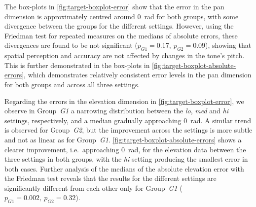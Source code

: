 \documentclass[acmsmall]{acmart}
\begin{document}
The box-plots in \cref{fig:target-boxplot-error} show that the error in the pan dimension is approximately centred around \SI{0}{\radian} for both groups, with some divergence between the groups for the different settings.
However, using the Friedman test for repeated measures on the medians of absolute errors, these divergences are found to be not significant ($p_{G1} = 0.17,~p_{G2} = 0.09$), showing that spatial perception and accuracy are not affected by changes in the tone's pitch.
This is further demonstrated in the box-plots in \cref{fig:target-boxplot-absolute-errors}, which demonstrates relatively consistent error levels in the pan dimension for both groups and across all three settings. 

Regarding the errors in the elevation dimension in \cref{fig:target-boxplot-error}, we observe in Group~\textit{G1} a narrowing distribution between the \textit{lo}, \textit{med} and \textit{hi} settings, respectively, and a median gradually approaching \SI{0}{\radian}.
A similar trend is observed for Group~\textit{G2}, but the improvement across the settings is more subtle and not as linear as for Group~\textit{G1}.
\cref{fig:target-boxplot-absolute-errors} shows a clearer improvement, i.e.\ approaching \SI{0}{\radian}, for the elevation data between the three settings in both groups, with the \textit{hi} setting producing the smallest error in both cases.
Further analysis of the medians of the absolute elevation error with the Friedman test reveals that the results for the different settings are significantly different from each other only for Group~\textit{G1} ($p_{G1} = 0.002,~p_{G2} = 0.32$).
\end{document}
